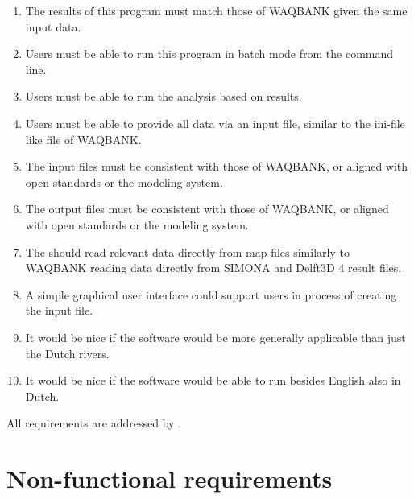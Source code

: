 \begin{enumerate}
\item The results of this program must match those of WAQBANK given the same input data.
\item Users must be able to run this program in batch mode from the command line.
\item Users must be able to run the analysis based on \dflowfm results.
\item Users must be able to provide all data via an input file, similar to the ini-file like file of WAQBANK.
\item The input files must be consistent with those of WAQBANK, or aligned with open standards or the \dflowfm modeling system.
\item The output files must be consistent with those of WAQBANK, or aligned with open standards or the \dflowfm modeling system.

\item The should read relevant data directly from \dflowfm map-files similarly to WAQBANK reading data directly from SIMONA and Delft3D 4 result files.

\item A simple graphical user interface could support users in process of creating the input file.

\item It would be nice if the software would be more generally applicable than just the Dutch rivers.
\item It would be nice if the software would be able to run besides English also in Dutch.
\end{enumerate}

All requirements are addressed by \dfastbe.

\section{Non-functional requirements}

